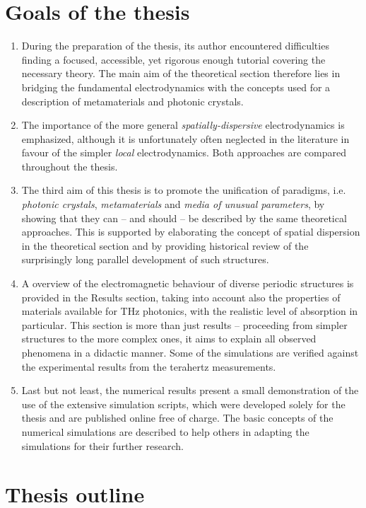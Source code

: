
\section{Goals of the thesis}%
\begin{enumerate}
\item{During the preparation of the thesis, its author encountered difficulties finding a focused, accessible, yet rigorous enough tutorial covering the necessary theory. The main aim of the theoretical section therefore lies in bridging the fundamental electrodynamics with the concepts used for a description of metamaterials and photonic crystals.} 
\item{The importance of the more general \textit{spatially-dispersive} electrodynamics is emphasized, although it is unfortunately often neglected in the literature in favour of the simpler \textit{local} electrodynamics. Both approaches are compared throughout the thesis.} 
\item{The third aim of this thesis is to promote the unification of paradigms, i.e. \textit{photonic crystals}, \textit{metamaterials} and \textit{media of unusual parameters}, by showing that they can -- and should -- be described by the same theoretical approaches. This is supported by elaborating the concept of spatial dispersion in the theoretical section and by providing historical review of the surprisingly long parallel development of such structures.} 
\item{A overview of the electromagnetic behaviour of diverse periodic structures is provided in the Results section, taking into account also the properties of materials available for THz photonics, with the realistic level of absorption in particular. This section is more than just results -- proceeding from simpler structures to the more complex ones, it aims to explain all observed phenomena in a didactic manner. Some of the simulations are verified against the experimental results from the terahertz measurements.} 
\item{Last but not least, the numerical results present a small demonstration of the use of the extensive simulation scripts, which were developed solely for the thesis and are published online free of charge. The basic concepts of the numerical simulations are described to help others in adapting the simulations for their further research. } 
\end{enumerate}
\section{Thesis outline}

